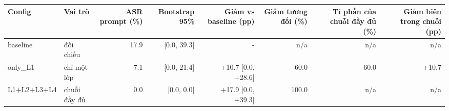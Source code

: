 \begin{tabular}{llrrrrrr}
\toprule
Config & Vai trò & ASR prompt (\%) & Bootstrap 95\% & Giảm vs baseline (pp) & Giảm tương đối (\%) & Tỉ phần của chuỗi đầy đủ (\%) & Giảm biên trong chuỗi (pp) \\
\midrule
baseline & đối chiếu & 17.9 & [0.0, 39.3] & - & n/a & n/a & n/a \\
only\_L1 & chỉ một lớp & 7.1 & [0.0, 21.4] & +10.7 [0.0, +28.6] & 60.0 & 60.0 & +10.7 \\
L1+L2+L3+L4 & chuỗi đầy đủ & 0.0 & [0.0, 0.0] & +17.9 [0.0, +39.3] & 100.0 & n/a & n/a \\
\bottomrule
\end{tabular}
